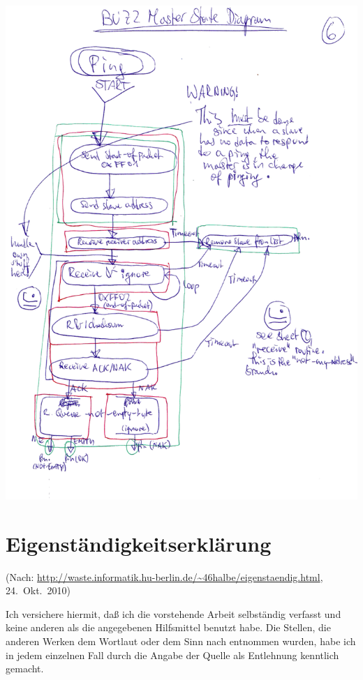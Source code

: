 \documentclass[12pt,a4paper,notitlepage]{article}
\begin{document}
\begin{center}
\includegraphics[width=\textwidth]{images/image5_enhanced_small.png}
\end{center}
\newpage
\restoregeometry
\section{Eigenständigkeitserklärung}
{\scriptsize(Nach: \url{http://waste.informatik.hu-berlin.de/~46halbe/eigenstaendig.html}, 24.\ Okt.\ 2010)}

Ich versichere hiermit, daß ich die vorstehende Arbeit selbständig verfasst und keine anderen als die angegebenen Hilfsmittel benutzt habe. Die Stellen, die anderen Werken dem Wortlaut oder dem Sinn nach entnommen wurden, habe ich in jedem einzelnen Fall durch die Angabe der Quelle als Entlehnung kenntlich gemacht.
\end{document}
